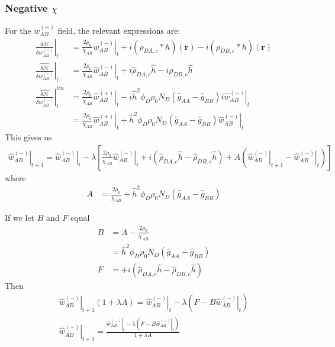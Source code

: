 \documentclass{article}
\begin{document}
    \subsubsection{Negative $\chi$}
  For the $w_{AB}^{(-)}$ field, the relevant expressions are:
  \begin{align*}
    \left. \frac{\delta \mathcal{H}}{\delta w_{AB}^{(-)}} \right|_t &=
      \frac{2 \rho_0}{\chi_{AB}} \left. w_{AB}^{(-)} \right|_t
      +i (\rho_{DA,c} \ast h)(\mathbf{r})
      -i (\rho_{DB,c} \ast h)(\mathbf{r}) \\
    \left. \hat{\frac{\delta \mathcal{H}}{\delta w_{AB}^{(-)}}} \right|_t &=
      \frac{2 \rho_0}{\chi_{AB}} \left. \hat{w}_{AB}^{(-)} \right|_t
      +i \hat{\rho}_{DA,c} \hat{h}
      -i \hat{\rho}_{DB,c} \hat{h} \\
    \left.
      \hat{\frac{\delta \mathcal{H}}{\delta w_{AB}^{(-)}}}
    \right| ^{lin}_t &=
    \frac{2\rho_0}{\chi_{AB}} \left. \hat{w}_{AB}^{(+)} \right|_t
      - i \hat{h}^2 \phi_D \rho_0 N_D
        (\hat{g}_{AA} - \hat{g}_{BB}) i \left.
          \hat{w}_{AB}^{(-)} \right|_t \\
    &= \frac{2\rho_0}{\chi_{AB}} \left. \hat{w}_{AB}^{(+)} \right|_t
      + \hat{h}^2 \phi_D \rho_0 N_D
        (\hat{g}_{AA} - \hat{g}_{BB})
          \left. \hat{w}_{AB}^{(-)} \right|_t
  \end{align*}
  This gives us
  \begin{align*}
    \left. \hat{w}_{AB}^{(-)} \right|_{t+1} =
      \left. \hat{w}_{AB}^{(-)} \right|_t - \lambda \left[
        \frac{2\rho_0}{\chi_{AB}} \left. \hat{w}_{AB}^{(-)} \right|_t
        + i ( \hat{\rho}_{DA,c} \hat{h}
              - \hat{\rho}_{DB,c} \hat{h} )
        + A ( \left. \hat{w}_{AB}^{(-)} \right|_{t+1}
              - \left. \hat{w}_{AB}^{(-)} \right|_t)
      \right]
  \end{align*}
  where
  \begin{align*}
    A &=
    \frac{2\rho_0}{\chi_{AB}} 
      + \hat{h}^2 \phi_D \rho_0 N_D
        (\hat{g}_{AA} - \hat{g}_{BB})
  \end{align*}

  If we let $B$ and $F$ equal
  \begin{align*}
    B &= A - \frac{2\rho_0}{\chi_{AB}} \\
      &=\hat{h}^2 \phi_D \rho_0 N_D
        (\hat{g}_{AA} - \hat{g}_{BB}) \\
    F &= + i ( \hat{\rho}_{DA,c} \hat{h}
              - \hat{\rho}_{DB,c} \hat{h} )
  \end{align*}
  Then
  \begin{align*}
    \left. \hat{w}_{AB}^{(-)} \right|_{t+1} ( 1 + \lambda A ) =
      \left. \hat{w}_{AB}^{(-)} \right|_t
      - \lambda \left( F - B \left. \hat{w}_{AB}^{(-)} \right|_t \right) \\
    \left. \hat{w}_{AB}^{(-)} \right|_{t+1} =
    \frac{\left. \hat{w}_{AB}^{(-)} \right|_t - \lambda
            \left( F - B \left. \hat{w}_{AB}^{(-)} \right|_t \right)}
         {1 + \lambda A}
  \end{align*}
\end{document}
